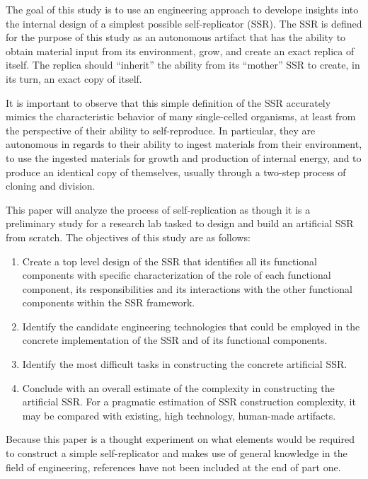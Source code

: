 The goal of this study is to use an engineering approach to develope
insights into the internal design of a simplest possible self-replicator (SSR). 
The SSR is defined for the purpose of this study as
an autonomous artifact that has the ability to obtain material input from
its environment, grow, and create an exact replica of itself. The
replica should ``inherit'' the ability from its ``mother'' SSR to create,
in its turn, an exact copy of itself.

It is important to observe that this simple definition of the SSR accurately mimics the characteristic behavior of many single-celled organisms, at least from the perspective of their ability to self-reproduce. In particular, they are autonomous in regards to their ability to ingest materials from their environment, to use the ingested materials for growth and production of internal energy, and to produce an identical copy of themselves, usually through a two-step process of cloning and division. 

This paper will analyze the process of self-replication as though it is a preliminary study for a research lab tasked to design and build an artificial SSR from scratch. The objectives of this study are as follows:

\begin{enumerate}
\item  Create a top level design of the SSR that identifies all its
functional components with specific characterization of the role of
each functional component, its responsibilities and its interactions
with the other functional components within the SSR framework.
\item  Identify the candidate engineering technologies that could be employed in
the concrete implementation of the SSR and of its functional
components.
\item  Identify the most difficult tasks in constructing the
concrete artificial SSR.
\item  Conclude with an overall estimate of the complexity 
in constructing
the artificial SSR. For a pragmatic estimation of
SSR construction complexity, it may be compared with 
existing, high technology, human-made artifacts.
\end{enumerate}

Because this paper is a thought experiment on what elements would be required to construct a simple self-replicator and makes use of general knowledge in the field of engineering, references have not been included at the end of part one.

